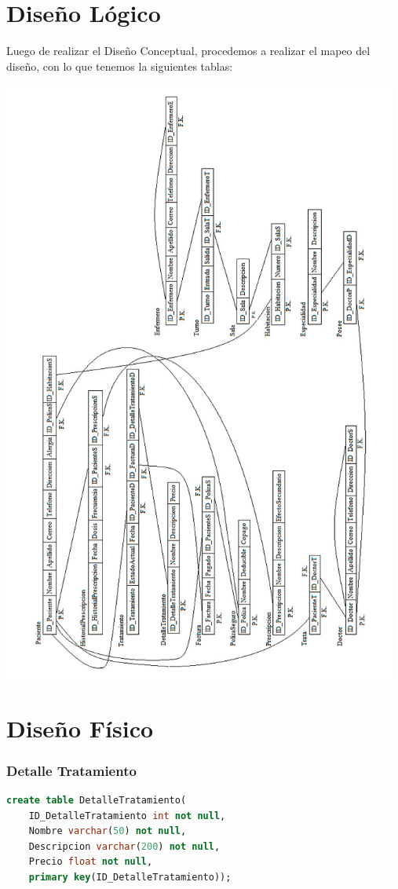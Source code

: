 \documentclass[10pt,letterpaper]{book}
\begin{document}
\section*{Diseño Lógico}
Luego de realizar el Diseño Conceptual, procedemos a realizar el mapeo del diseño, con lo que tenemos la siguientes tablas:
\begin{center}
\includegraphics[width=13cm]{dd} 
\end{center}
\section*{Diseño Físico}
\subsubsection{Detalle Tratamiento}
\begin{lstlisting}[language=sql]
create table DetalleTratamiento(
	ID_DetalleTratamiento int not null,
	Nombre varchar(50) not null,
	Descripcion varchar(200) not null,
	Precio float not null,
	primary key(ID_DetalleTratamiento));
\end{lstlisting}
\end{document}
